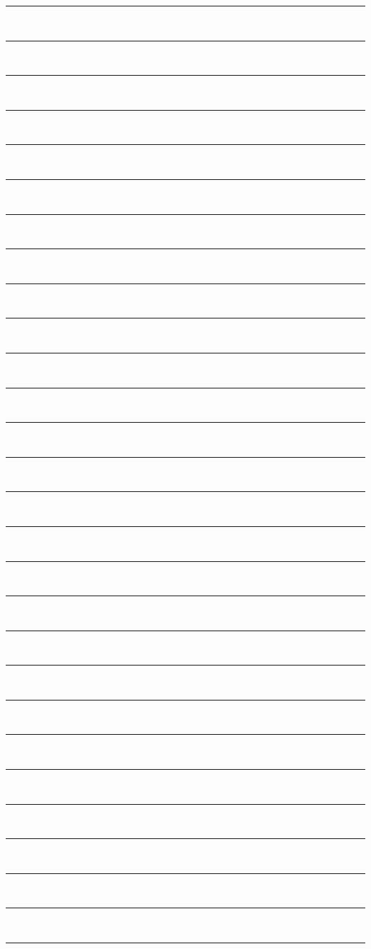 \newpage
\noindent
\noindent\rule{\textwidth}{1pt}\\
\noindent\rule{\textwidth}{1pt}\\
\noindent\rule{\textwidth}{1pt}\\
\noindent\rule{\textwidth}{1pt}\\
\noindent\rule{\textwidth}{1pt}\\
\noindent\rule{\textwidth}{1pt}\\
\noindent\rule{\textwidth}{1pt}\\
\noindent\rule{\textwidth}{1pt}\\
\noindent\rule{\textwidth}{1pt}\\
\noindent\rule{\textwidth}{1pt}\\
\noindent\rule{\textwidth}{1pt}\\
\noindent\rule{\textwidth}{1pt}\\
\noindent\rule{\textwidth}{1pt}\\
\noindent\rule{\textwidth}{1pt}\\
\noindent\rule{\textwidth}{1pt}\\
\noindent\rule{\textwidth}{1pt}\\
\noindent\rule{\textwidth}{1pt}\\
\noindent\rule{\textwidth}{1pt}\\
\noindent\rule{\textwidth}{1pt}\\
\noindent\rule{\textwidth}{1pt}\\
\noindent\rule{\textwidth}{1pt}\\
\noindent\rule{\textwidth}{1pt}\\
\noindent\rule{\textwidth}{1pt}\\
\noindent\rule{\textwidth}{1pt}\\
\noindent\rule{\textwidth}{1pt}\\
\noindent\rule{\textwidth}{1pt}\\
\noindent\rule{\textwidth}{1pt}\\
\noindent\rule{\textwidth}{1pt}\\


